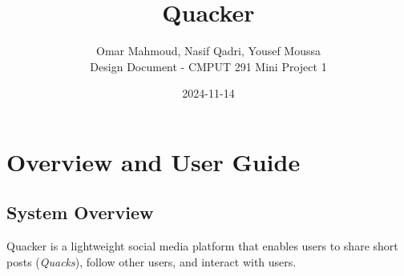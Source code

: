 \documentclass[11pt]{article}
\begin{document}
\title{\huge Quacker}
\author{Omar Mahmoud,  Nasif Qadri,  Yousef Moussa\\[0.5cm] 
Design Document - CMPUT 291 Mini Project 1\\}
\date{2024-11-14}

\maketitle


\section{Overview and User Guide}

\subsection{System Overview}
Quacker is a lightweight social media platform that enables users to share short posts (\textit{Quacks}), follow other users, and interact with users. 
\end{document}
